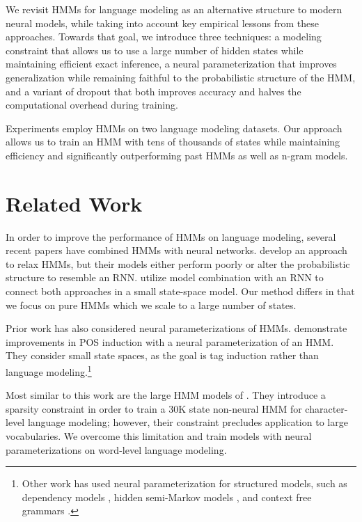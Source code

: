 \documentclass[11pt,a4paper]{article}
\begin{document}
We revisit HMMs for language modeling
as an alternative structure to modern neural models, while taking into account key empirical lessons from these approaches. 
Towards that goal, we introduce three techniques:
a modeling constraint that allows us to use a large number of hidden states 
while maintaining efficient exact inference,
a neural parameterization that improves
generalization while remaining faithful to the
probabilistic structure of the HMM,
and a variant of dropout that both improves accuracy
and halves the computational overhead during training.

Experiments employ HMMs on two language modeling datasets.
Our approach allows us to train an HMM with tens of thousands of states while maintaining efficiency and
significantly outperforming past HMMs as well as n-gram models.

\section{Related Work}
\label{sec:rw}
In order to improve the performance of HMMs on language modeling,
several recent papers have combined HMMs with neural networks.
\citet{buys2018hmm} develop an approach to relax HMMs,
but their models either perform poorly or alter the probabilistic structure to resemble an RNN. 
\citet{krakovna2016hmm} utilize model combination with an RNN to connect both approaches in a
small state-space model. Our method differs in that we focus on pure HMMs which we scale to a large number of states.

Prior work has also considered neural parameterizations of HMMs. 
\citet{tran2016hmm} demonstrate improvements in POS induction with a
neural parameterization of an HMM.
They consider small state spaces,
as the goal is tag induction rather than language modeling.\footnote{
Other work has used neural parameterization for structured models, such as 
dependency models \citep{han2017dependency},
hidden semi-Markov models \citep{wiseman2018hsmm},
and context free grammars \citep{kim2019cpcfg}.
}

Most similar to this work are the large HMM models of 
\citet{dedieu2019learning}. They introduce a sparsity constraint
in order to train a 30K state non-neural HMM for character-level language modeling;
however, their constraint precludes application to large vocabularies.
We overcome this limitation and train models with 
neural parameterizations on word-level language modeling.
\end{document}
